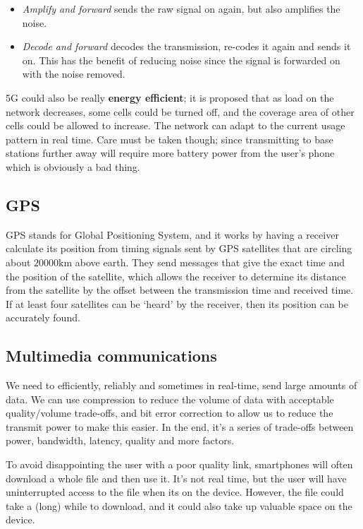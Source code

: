 \begin{itemize}
  \item \textit{Amplify and forward} sends the raw signal on again, but also
  amplifies the noise.
  \item \textit{Decode and forward} decodes the transmission, re-codes it again
  and sends it on. This has the benefit of reducing noise since the signal
  is forwarded on with the noise removed.
\end{itemize}

5G could also be really \textbf{energy efficient}; it is proposed that as load
on the network decreases, some cells could be turned off, and the coverage area
of other cells could be allowed to increase. The network can adapt to the
current usage pattern in real time. Care must be taken though; since
transmitting to base stations further away will require more battery power from
the user's phone which is obviously a bad thing.

\subsection{GPS}

GPS stands for Global Positioning System, and it works by having a receiver
calculate its position from timing signals sent by GPS satellites that are
circling about $20000\si{\kilo\meter}$ above earth. They send messages that give
the exact time and the position of the satellite, which allows the receiver to
determine its distance from the satellite by the offset between the transmission
time and received time. If at least four satellites can be `heard' by the
receiver, then its position can be accurately found.

\subsection{Multimedia communications}

We need to efficiently, reliably and sometimes in real-time, send large amounts
of data. We can use compression to reduce the volume of data with acceptable
quality/volume trade-offs, and bit error correction to allow us to reduce the
transmit power to make this easier. In the end, it's a series of trade-offs
between power, bandwidth, latency, quality and more factors.

To avoid disappointing the user with a poor quality link, smartphones will often
download a whole file and then use it. It's not real time, but the user will
have uninterrupted access to the file when its on the device. However, the file
could take a (long) while to download, and it could also take up valuable space
on the device.

